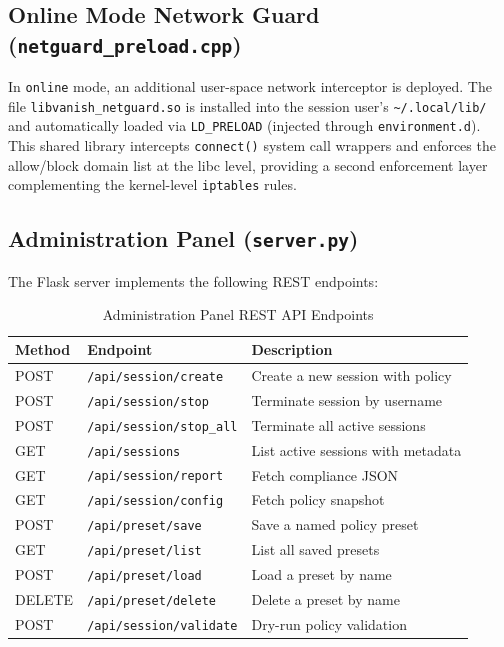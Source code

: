 \subsection{Online Mode Network Guard (\texttt{netguard\_preload.cpp})}

In \texttt{online} mode, an additional user-space network interceptor is deployed. The file \texttt{libvanish\_netguard.so} is installed into the session user's \texttt{\textasciitilde/.local/lib/} and automatically loaded via \texttt{LD\_PRELOAD} (injected through \texttt{environment.d}). This shared library intercepts \texttt{connect()} system call wrappers and enforces the allow/block domain list at the libc level, providing a second enforcement layer complementing the kernel-level \texttt{iptables} rules.

\subsection{Administration Panel (\texttt{server.py})}

The Flask server implements the following REST endpoints:

\begin{table}[H]
\centering
\caption{Administration Panel REST API Endpoints}
\label{tab:api_endpoints}
\begin{tabularx}{\linewidth}{l p{4.5cm} X}
\toprule
Method & Endpoint & Description \\
\midrule
POST & \texttt{/api/session/create} & Create a new session with policy \\
POST & \texttt{/api/session/stop} & Terminate session by username \\
POST & \texttt{/api/session/stop\_all} & Terminate all active sessions \\
GET  & \texttt{/api/sessions} & List active sessions with metadata \\
GET  & \texttt{/api/session/report} & Fetch compliance JSON \\
GET  & \texttt{/api/session/config} & Fetch policy snapshot \\
POST & \texttt{/api/preset/save} & Save a named policy preset \\
GET  & \texttt{/api/preset/list} & List all saved presets \\
POST & \texttt{/api/preset/load} & Load a preset by name \\
DELETE & \texttt{/api/preset/delete} & Delete a preset by name \\
POST & \texttt{/api/session/validate} & Dry-run policy validation \\
\bottomrule
\end{tabularx}
\end{table}


